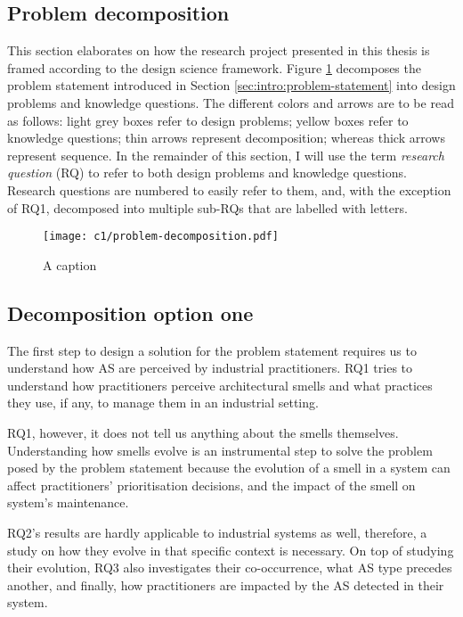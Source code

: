 \subsection{Problem decomposition}
This section elaborates on how the research project presented in this thesis is framed according to the design science framework. 
Figure \ref{fig:intro:problem-decomposition} decomposes the problem statement introduced in Section \ref{sec:intro:problem-statement} into design problems and knowledge questions.
The different colors and arrows are to be read as follows: light grey boxes refer to design problems; yellow boxes refer to knowledge questions; thin arrows represent decomposition; whereas thick arrows represent sequence.
In the remainder of this section, I will use the term \emph{research question} (RQ) to refer to both design problems and knowledge questions.
Research questions are numbered to easily refer to them, and, with the exception of RQ1, decomposed into multiple sub-RQs that are labelled with letters.

\begin{figure}
    \centering
    \texttt{[image: c1/problem-decomposition.pdf]}
    \caption{A caption}\label{fig:intro:problem-decomposition}
\end{figure}

\subsection{Decomposition option one}
The first step to design a solution for the problem statement requires us to understand how AS are perceived by industrial practitioners.
RQ1 tries to understand how practitioners perceive architectural smells and what practices they use, if any, to manage them in an industrial setting.

RQ1, however, it does not tell us anything about the smells themselves. Understanding how smells evolve is an instrumental step to solve the problem posed by the problem statement because the evolution of a smell in a system can affect practitioners' prioritisation decisions, and the impact of the smell on system's maintenance.

RQ2's results are hardly applicable to industrial systems as well, therefore, a study on how they evolve in that specific context is necessary.
On top of studying their evolution, RQ3 also investigates their co-occurrence, what AS type precedes another, and finally, how practitioners are impacted by the AS detected in their system.

